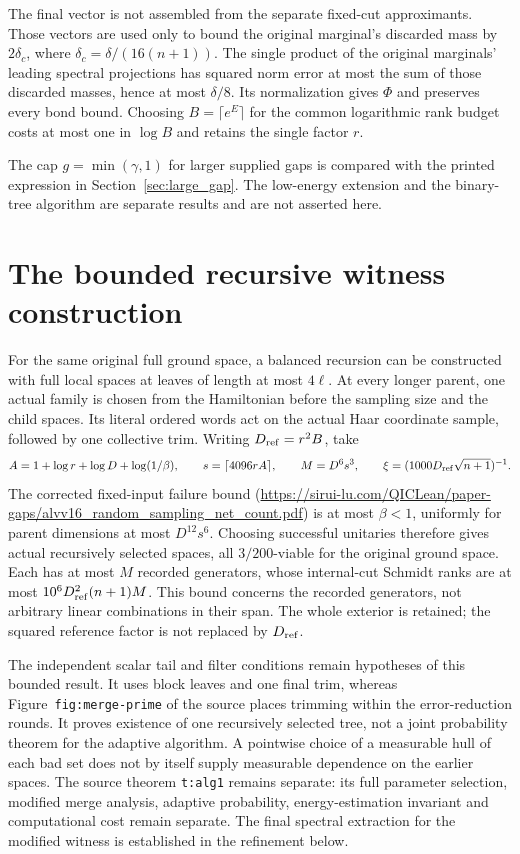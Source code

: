 \documentclass{article}
\begin{document}
The final vector is not assembled from the separate fixed-cut approximants.
Those vectors are used only to bound the original marginal's discarded mass
by $2\delta_c$, where $\delta_c=\delta/(16(n+1))$.
The single product of the original marginals' leading spectral projections
has squared norm error at most the sum of those discarded masses, hence
at most $\delta/8$. Its normalization gives $\Phi$ and preserves every
bond bound. Choosing $B=\lceil e^E\rceil$ for the common logarithmic rank
budget costs at most one in $\log B$ and retains the single factor $r$.

The cap $g=\min(\gamma,1)$ for larger supplied gaps is compared with the
printed expression in Section~\ref{sec:large_gap}. The low-energy extension and
the binary-tree algorithm are separate results and are not asserted here.


\section*{The bounded recursive witness construction}

For the same original full ground space, a balanced recursion can be
constructed with full local spaces at leaves of length at most $4\ell$.
At every longer parent, one actual family is chosen from the Hamiltonian
before the sampling size and the child spaces. Its literal ordered words
act on the actual Haar coordinate sample, followed by one collective trim.
Writing $D_{\rm ref}=r^2B$, take
\begin{align}
    A=1+\log r+\log D+\log(1/\beta),\qquad
    s=\lceil4096rA\rceil,\qquad
    M=D^6s^3,\qquad
    \xi=(1000D_{\rm ref}\sqrt{n+1})^{-1}.
    \label{eq:alvv_approximation_bounded_witness_parameters}
\end{align}
The corrected fixed-input failure bound
(\url{https://sirui-lu.com/QICLean/paper-gaps/alvv16_random_sampling_net_count.pdf})
is at most $\beta<1$, uniformly
for parent dimensions at most $D^{12}s^6$. Choosing successful unitaries
therefore gives actual recursively selected spaces, all $3/200$-viable
for the original ground space. Each has at most $M$ recorded generators,
whose internal-cut Schmidt ranks are at most
$10^6D_{\rm ref}^2(n+1)M$. This bound concerns the recorded generators,
not arbitrary linear combinations in their span. The whole exterior is
retained; the squared reference factor is not replaced by $D_{\rm ref}$.

The independent scalar tail and filter conditions remain hypotheses of
this bounded result. It uses block leaves and one final trim, whereas
Figure~\texttt{fig:merge-prime} of the source places trimming within the
error-reduction rounds. It proves existence of one recursively selected
tree, not a joint probability theorem for the adaptive algorithm. A
pointwise choice of a measurable hull of each bad set does not by itself
supply measurable dependence on the earlier spaces. The source theorem
\texttt{t:alg1} remains separate: its full parameter selection, modified
merge analysis, adaptive probability, energy-estimation invariant and
computational cost remain separate. The final spectral extraction for
the modified witness is established in the refinement below.
\end{document}

